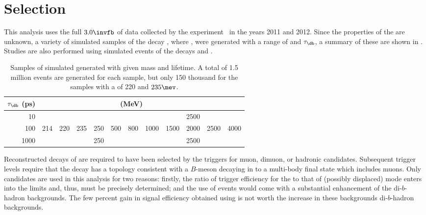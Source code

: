 \section{Selection}
\label{sec:db:sel}

This analysis uses the full $3.0\invfb$ of data collected by the \lhcb
experiment~\cite{Alves:2008zz} in the years 2011 and 2012.
Since the properties of the \db are unknown, a variety of simulated samples of the decay \btokstrdb,
where \dbtomumu, were generated with a range of \mass{\db} and $\tau_\db$, a summary of these are
shown in .
Studies are also performed using simulated events of the decays \btokstrmumu and \btojpsikstr.

\begin{table}
  \caption[Samples of simulated \btokstrdb generated for the analysis]{
    Samples of simulated \btokstrdb generated with given mass and lifetime.
    A total of 1.5 million events are generated for each sample, but only 150 thousand for the
    samples with a \mass{\db} of 220 and $235\mev$.
  }
  \label{tab:db:samples}
  \begin{center}
    \begin{tabular}{rccccccccccc}\toprule
      $\tau_\db$ (ps) & \multicolumn{10}{c}{\mass{\db} (MeV)} \\\midrule
      10 &&&&&&&&&2500 \\
      100 &214&220&235&250&500&800&1000&1500&2000&2500&4000 \\
      1000 &&&&250&&&&&2500 \\
      \bottomrule
    \end{tabular}
  \end{center}
\end{table}

Reconstructed decays of \btokstrdb are required to have been selected by the \lone triggers for
muon, dimuon, or hadronic candidates.
Subsequent trigger levels require that the decay has a topology consistent with a $B$-meson
decaying in to a multi-body final state which includes muons.
Only \TOS candidates are used in this analysis for two reasons: firstly, the ratio of trigger
efficiency for the \sm \btokstrmumu to that of (possibly displaced) \db mode enters
into the limits and, thus, must be precisely determined; and the use of \TIS events would
come with a substantial enhancement of the di-$b$-hadron backgrounds.
The few percent gain in signal efficiency obtained using \TIS is not worth the increase in these
backgrounds di-$b$-hadron backgrounds.


